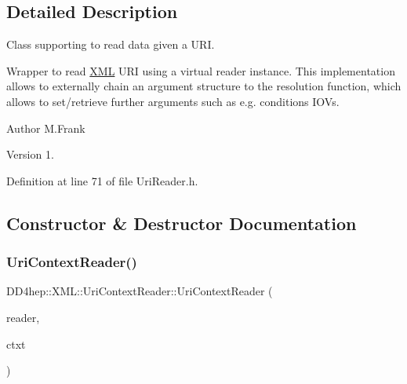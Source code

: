 \subsection{Detailed Description}
Class supporting to read data given a U\+RI. 

Wrapper to read \hyperlink{namespace_d_d4hep_1_1_x_m_l}{X\+ML} U\+RI using a virtual reader instance. This implementation allows to externally chain an argument structure to the resolution function, which allows to set/retrieve further arguments such as e.\+g. conditions I\+O\+Vs.

\begin{DoxyAuthor}{Author}
M.\+Frank 
\end{DoxyAuthor}
\begin{DoxyVersion}{Version}
1. 
\end{DoxyVersion}


Definition at line 71 of file Uri\+Reader.\+h.



\subsection{Constructor \& Destructor Documentation}
\hypertarget{class_d_d4hep_1_1_x_m_l_1_1_uri_context_reader_aede2321d47f8d747c084287e367b35ac}{}\label{class_d_d4hep_1_1_x_m_l_1_1_uri_context_reader_aede2321d47f8d747c084287e367b35ac} 
\subsubsection{\texorpdfstring{Uri\+Context\+Reader()}{UriContextReader()}\hspace{0.1cm}{\footnotesize\ttfamily [1/2]}}
{\footnotesize\ttfamily D\+D4hep\+::\+X\+M\+L\+::\+Uri\+Context\+Reader\+::\+Uri\+Context\+Reader (\begin{DoxyParamCaption}\item[{\hyperlink{class_d_d4hep_1_1_x_m_l_1_1_uri_reader}{Uri\+Reader} $\ast$}]{reader,  }\item[{\hyperlink{struct_d_d4hep_1_1_x_m_l_1_1_uri_reader_1_1_user_context}{Uri\+Reader\+::\+User\+Context} $\ast$}]{ctxt }\end{DoxyParamCaption})}



